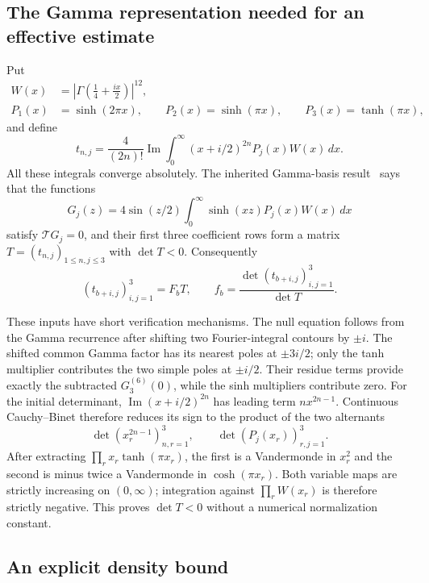\subsection{The Gamma representation needed for an effective estimate}

Put
\begin{align*}
 W(x)&=\left|\Gamma\!\left(\tfrac14+\tfrac{ix}{2}\right)\right|^{12},\\
 P_1(x)&=\sinh(2\pi x),\qquad
 P_2(x)=\sinh(\pi x),\qquad
 P_3(x)=\tanh(\pi x),
\end{align*}
and define
\begin{equation}\label{gs:t}
 t_{n,j}=\frac4{(2n)!}\operatorname{Im}
           \int_0^\infty(x+i/2)^{2n}P_j(x)W(x)\,dx.
\end{equation}
All these integrals converge absolutely.  The inherited Gamma-basis
result~\cite[Section~8, Gamma basis and positive normalization]{OrderedIncoming}
says that the functions
\[
 G_j(z)=4\sin(z/2)\int_0^\infty\sinh(xz)P_j(x)W(x)\,dx
\]
satisfy $\mathcal T G_j=0$, and their first three coefficient rows
form a matrix $T=(t_{n,j})_{1\le n,j\le3}$ with $\det T<0$.
Consequently
\begin{equation}\label{gs:Gamma-bridge}
 (t_{b+i,j})_{i,j=1}^3=F_bT,\qquad
 f_b=\frac{\det(t_{b+i,j})_{i,j=1}^3}{\det T}.
\end{equation}

These inputs have short verification mechanisms.  The null equation
follows from the Gamma recurrence after shifting two Fourier-integral
contours by $\pm i$.  The shifted common Gamma factor has its nearest
poles at $\pm3i/2$; only the tanh multiplier contributes the two
simple poles at $\pm i/2$.  Their residue terms provide exactly the
subtracted $G_3^{(6)}(0)$, while the sinh multipliers contribute zero.
For the initial determinant, $\operatorname{Im}(x+i/2)^{2n}$ has
leading term $nx^{2n-1}$.  Continuous Cauchy--Binet therefore reduces
its sign to the product of the two alternants
\[
 \det(x_r^{2n-1})_{n,r=1}^3,
 \qquad \det(P_j(x_r))_{r,j=1}^3.
\]
After extracting $\prod_r x_r\tanh(\pi x_r)$, the first is a
Vandermonde in $x_r^2$ and the second is minus twice a Vandermonde
in $\cosh(\pi x_r)$.  Both variable maps are strictly increasing
on $(0,\infty)$; integration against $\prod_rW(x_r)$ is therefore
strictly negative.  This proves $\det T<0$ without a numerical
normalization constant.

\subsection{An explicit density bound}


